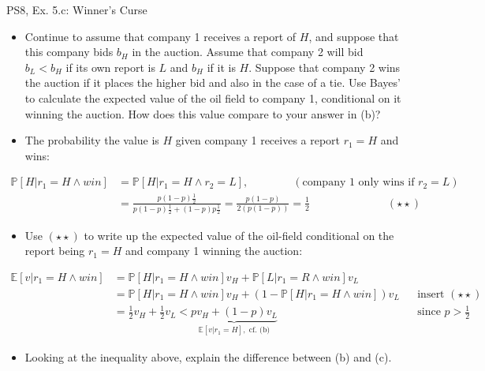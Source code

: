 \begin{frame}{PS8, Ex. 5.c: Winner's Curse}
      \begin{itemize}
        \item[(c)] Continue to assume that company 1 receives a report of $H$, and suppose that this company bids $b_H$ in the auction. Assume that company 2 will bid $b_L < b_H$ if its own report is $L$ and $b_H$ if it is $H$. Suppose that company 2 wins the auction if it places the higher bid and also in the case of a tie. Use Bayes’ to calculate the expected value of the oil field to company 1, conditional on it winning the auction. How does this value compare to your answer in (b)?
        \item[Step 1:] The probability the value is $H$ given company 1 receives a report $r_1=H$ and wins:
        \end{itemize}
        \vspace{-8pt}
        \begin{align*}
          \mathbb{P}[H|r_1=H\wedge win]&=\mathbb{P}[H|r_1=H\wedge r_2=L],\quad\quad\quad\quad(\text{company 1 only wins if }r_2=L)\\
            &=\frac{p(1-p)\frac{1}{2}}{p(1-p)\frac{1}{2}+(1-p)p\frac{1}{2}}=\frac{p(1-p)}{2(p(1-p))}=\frac{1}{2}\quad\quad\quad\quad\quad\quad\quad(\star\star)
        \end{align*}
        \vspace{-8pt}
        \begin{itemize}
        \item[Step 2:] Use $(\star\star)$ to write up the expected value of the oil-field conditional on the report being $r_1=H$ and company 1 winning the auction:
      \end{itemize}
      \vspace{-4pt}
      \begin{align*}
        \mathbb{E}[v|r_1=H\wedge win]&=\mathbb{P}[H|r_1=H\wedge win]v_H+\mathbb{P}[L|r_1=R\wedge win]v_L\\
        &=\mathbb{P}[H|r_1=H\wedge win]v_H+\left(1-\mathbb{P}[H|r_1=H\wedge win]\right)v_L&&\text{insert }(\star\star)\\
        &=\frac{1}{2}v_H+\frac{1}{2}v_L<\underbrace{pv_H+(1-p)v_L}_{\textstyle\mathbb{E}[v|r_1=H],\text{ cf. (b)}}&&\text{since }p>\frac{1}{2}
      \end{align*}
      \vspace{-10pt}
      \begin{itemize}
        \item[Step 3:] Looking at the inequality above, explain the difference between (b) and (c).
      \end{itemize}
      \vfill\null
\end{frame}
